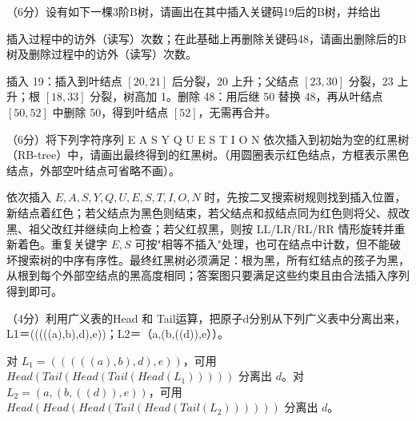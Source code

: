 \begin{question}
（6分）设有如下一棵3阶B树，请画出在其中插入关键码19后的B树，并给出

\begin{center}
\end{center}

插入过程中的访外（读写）次数；在此基础上再删除关键码48，请画出删除后的B树及删除过程中的访外（读写）次数。
\begin{solution}
插入 19：插入到叶结点 $[20,21]$ 后分裂，20 上升；父结点 $[23,30]$ 分裂，23 上升；根 $[18,33]$ 分裂，树高加 1。删除 48：用后继 50 替换 48，再从叶结点 $[50,52]$ 中删除 50，得到叶结点 $[52]$，无需再合并。
\end{solution}
\end{question}

\begin{question}
（6分）将下列字符序列 E A S Y Q U E S T I O N 依次插入到初始为空的红黑树（RB-tree）中，请画出最终得到的红黑树。（用圆圈表示红色结点，方框表示黑色结点，外部空叶结点可省略不画）。
\begin{solution}
依次插入 $E,A,S,Y,Q,U,E,S,T,I,O,N$ 时，先按二叉搜索树规则找到插入位置，新结点着红色；若父结点为黑色则结束，若父结点和叔结点同为红色则将父、叔改黑、祖父改红并继续向上检查；若父红叔黑，则按 LL/LR/RL/RR 情形旋转并重新着色。重复关键字 $E,S$ 可按"相等不插入"处理，也可在结点中计数，但不能破坏搜索树的中序有序性。最终红黑树必须满足：根为黑，所有红结点的孩子为黑，从根到每个外部空结点的黑高度相同；答案图只要满足这些约束且由合法插入序列得到即可。
\end{solution}
\end{question}

\begin{question}
（4分）利用广义表的Head 和 Tail运算，把原子d分别从下列广义表中分离出来，L1＝(((((a),b),d),e))；L2＝（a,(b,((d)),e））。
\begin{solution}
对 $L_1=(((((a),b),d),e))$，可用 $Head(Tail(Head(Tail(Head(L_1)))))$ 分离出 $d$。对 $L_2=(a,(b,((d)),e))$，可用 $Head(Head(Head(Tail(Head(Tail(L_2))))))$ 分离出 $d$。
\end{solution}
\end{question}

